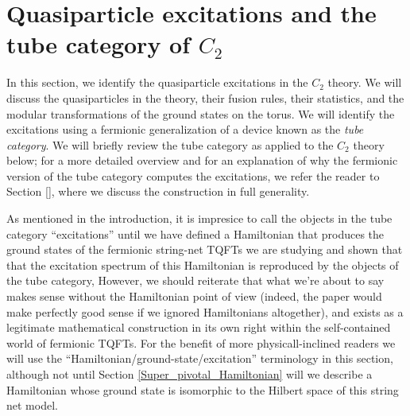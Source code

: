 \documentclass[12pt,a4paper]{article}
\newcommand{\kw}[1]{{\color{kwcolor}\footnotesize{(KW) #1}}}
\newcommand{\dave}[1]{{\color{ao(english)}\footnotesize{(DA) #1}}}
\begin{document}
\section{Quasiparticle excitations and the tube category of $C_2$} \label{C2_quasiparticles}

In this section, we identify the quasiparticle excitations 
in the $C_2$ theory.
We will discuss the quasiparticles in the theory, their fusion rules, their statistics, and the modular transformations of the ground states on the torus.
We will identify the excitations using a fermionic generalization of a device known as the {\it tube category}. 
We will briefly review the tube category as applied to the $C_2$ theory below; for a more detailed overview and for an explanation of why the fermionic version of the tube category computes the excitations, we refer the reader to Section \ref{}, where we discuss the construction in full generality. 

As mentioned in the introduction, it is impresice to call the objects in the tube category ``excitations'' until 
we have defined a Hamiltonian that produces the ground states of the fermionic string-net TQFTs 
we are studying and shown that that the excitation spectrum of this Hamiltonian is reproduced by the 
objects of the tube category, However, we should reiterate that what we're about to say makes sense without the Hamiltonian point of view (indeed, the paper would make perfectly good sense if we ignored Hamiltonians altogether), and 
exists as a legitimate mathematical construction in its own right 
within the self-contained world of fermionic TQFTs. 
For the benefit of more physicall-inclined readers 
we will use the ``Hamiltonian/ground-state/excitation'' terminology 
in this section, although not until Section \ref{Super_pivotal_Hamiltonian} will we describe a Hamiltonian whose ground state is isomorphic 
to the Hilbert space of this string net model.

\end{document}
